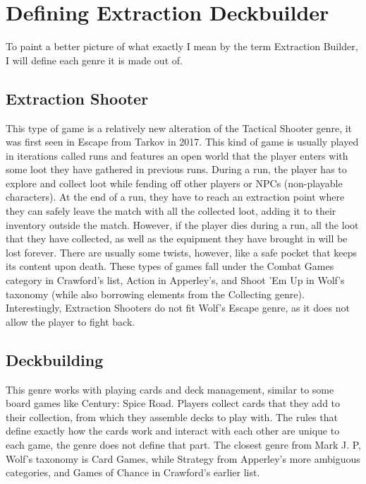 \section{Defining Extraction Deckbuilder}

To paint a better picture of what exactly I mean by the term Extraction Builder, I will define each genre it is made out of.


\subsection{Extraction Shooter}

This type of game is a relatively new alteration of the Tactical Shooter genre, it was first seen in Escape from Tarkov\cite{escapeFromTarkov2017} in 2017. This kind of game is usually played in iterations called runs and features an open world that the player enters with some loot they have gathered in previous runs. During a run, the player has to explore and collect loot while fending off other players or NPCs (non-playable characters). At the end of a run, they have to reach an extraction point where they can safely leave the match with all the collected loot, adding it to their inventory outside the match. However, if the player dies during a run, all the loot that they have collected, as well as the equipment they have brought in will be lost forever. There are usually some twists, however, like a safe pocket that keeps its content upon death. These types of games fall under the Combat Games category in Crawford's list\cite{crawford1984art}, Action in Apperley's, and Shoot 'Em Up in Wolf's taxonomy (while also borrowing elements from the Collecting genre). Interestingly, Extraction Shooters do not fit Wolf's Escape genre, as it does not allow the player to fight back.



\subsection{Deckbuilding}

This genre works with playing cards and deck management, similar to some board games like Century: Spice Road. Players collect cards that they add to their collection, from which they assemble decks to play with. The rules that define exactly how the cards work and interact with each other are unique to each game, the genre does not define that part. The closest genre from Mark J. P, Wolf's taxonomy\cite{wolf2002genre} is Card Games, while Strategy from Apperley's\cite{apperley2006genre} more ambiguous categories, and Games of Chance in Crawford's earlier list\cite{crawford1984art}.



